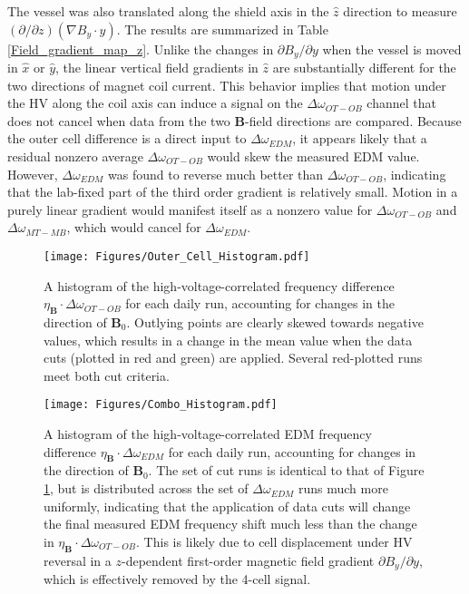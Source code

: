 \documentclass [10pt, twoside] {uwthesis}[2012/04/02]
\begin{document}
The vessel was also translated along the shield axis in the $\hat{z}$ direction to measure $(\partial/\partial z)(\nabla B_y\cdot\hat{y})$. The results are summarized in Table \ref{Field_gradient_map_z}. Unlike the changes in $\partial B_y/\partial y$ when the vessel is moved in $\hat{x}$ or $\hat{y}$, the linear vertical field gradients in $\hat{z}$ are substantially different for the two directions of magnet coil current. This behavior implies that motion under the HV along the coil axis can induce a signal on the $\Delta\omega_{OT-OB}$ channel that does not cancel when data from the two $\mathbf{B}$-field directions are compared. Because the outer cell difference is a direct input to $\Delta\omega_{EDM}$, it appears likely that a residual nonzero average $\Delta\omega_{OT-OB}$ would skew the measured EDM value. However, $\Delta\omega_{EDM}$ was found to reverse much better than $\Delta\omega_{OT-OB}$, indicating that the lab-fixed part of the third order gradient is relatively small. Motion in a purely linear gradient would manifest itself as a nonzero value for $\Delta\omega_{OT-OB}$ and $\Delta\omega_{MT-MB}$, which would cancel for $\Delta\omega_{EDM}$. 

\begin{figure} \begin{center}
\texttt{[image: Figures/Outer\_Cell\_Histogram.pdf]}
\end{center}
\caption[Histogram of HV-correlated outer cell frequency difference]%
{\narrower A histogram of the high-voltage-correlated frequency difference $\eta_{\mathbf{B}}\cdot\Delta\omega_{OT-OB}$ for each daily run, accounting for changes in the direction of $\mathbf{B}_0$. Outlying points are clearly skewed towards negative values, which results in a change in the mean value when the data cuts (plotted in red and green) are applied. Several red-plotted runs meet both cut criteria.}
\label{Outer_Cell_Histogram}
\end{figure}
\begin{figure}
\begin{center}
\texttt{[image: Figures/Combo\_Histogram.pdf]}
\end{center}
\caption[Histogram of HV-correlated $\Delta\omega_{EDM}$]%
{\narrower A histogram of the high-voltage-correlated EDM frequency difference $\eta_{\mathbf{B}}\cdot\Delta\omega_{EDM}$ for each daily run, accounting for changes in the direction of $\mathbf{B}_0$. The set of cut runs is identical to that of Figure \ref{Outer_Cell_Histogram}, but is distributed across the set of $\Delta\omega_{EDM}$ runs much more uniformly, indicating that the application of data cuts will change the final measured EDM frequency shift much less than the change in $\eta_{\mathbf{B}}\cdot\Delta\omega_{OT-OB}$. This is likely due to cell displacement under HV reversal in a $z$-dependent first-order magnetic field gradient $\partial B_y/\partial y$, which is effectively removed by the 4-cell signal.}
\label{Combo_Histogram}
\end{figure}
\end{document}
